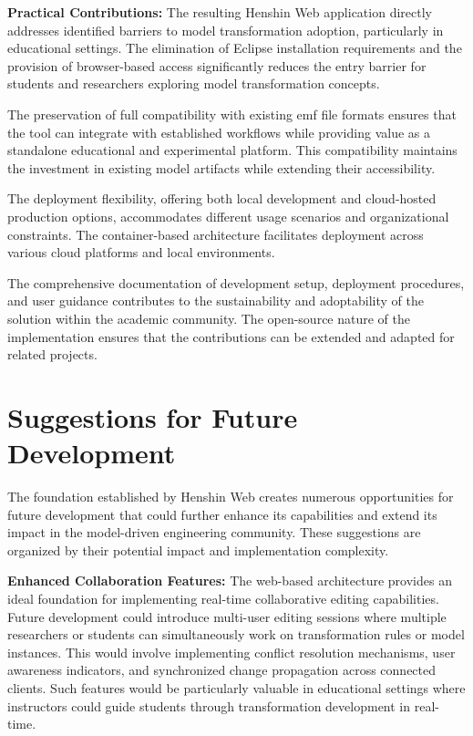   \textbf{Practical Contributions:} The resulting Henshin Web application directly addresses identified barriers to model transformation adoption, particularly in educational settings. The elimination of Eclipse installation requirements and the provision of browser-based access significantly reduces the entry barrier for students and researchers exploring model transformation concepts.

  The preservation of full compatibility with existing \ac{emf} file formats ensures that the tool can integrate with established workflows while providing value as a standalone educational and experimental platform. This compatibility maintains the investment in existing model artifacts while extending their accessibility.

  The deployment flexibility, offering both local development and cloud-hosted production options, accommodates different usage scenarios and organizational constraints. The container-based architecture facilitates deployment across various cloud platforms and local environments.

  The comprehensive documentation of development setup, deployment procedures, and user guidance contributes to the sustainability and adoptability of the solution within the academic community. The open-source nature of the implementation ensures that the contributions can be extended and adapted for related projects.

  \section{Suggestions for Future Development}
  \label{subsec:suggestions-future-development}

  The foundation established by Henshin Web creates numerous opportunities for future development that could further enhance its capabilities and extend its impact in the model-driven engineering community. These suggestions are organized by their potential impact and implementation complexity.

  \textbf{Enhanced Collaboration Features:} The web-based architecture provides an ideal foundation for implementing real-time collaborative editing capabilities. Future development could introduce multi-user editing sessions where multiple researchers or students can simultaneously work on transformation rules or model instances. This would involve implementing conflict resolution mechanisms, user awareness indicators, and synchronized change propagation across connected clients. Such features would be particularly valuable in educational settings where instructors could guide students through transformation development in real-time.

